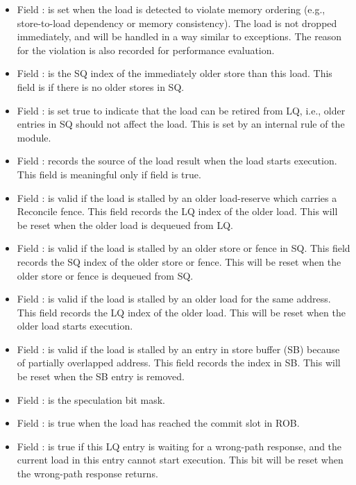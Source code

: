 \begin{itemize}
    \item Field : is set when the load is detected to violate memory ordering (e.g., store-to-load dependency or memory consistency).
    The load is not dropped immediately, and will be handled in a way similar to exceptions.
    The reason for the violation is also recorded for performance evaluation.
    \item Field : is the SQ index of the immediately older store than this load.
    This field is  if there is no older stores in SQ.
    \item Field : is set true to indicate that the load can be retired from LQ, i.e., older entries in SQ should not affect the load.
    This is set by an internal rule of the module.
    \item Field : records the source of the load result when the load starts execution.
    This field is meaningful only if field  is true.
    \item Field : is valid if the load is stalled by an older load-reserve which carries a Reconcile fence.
    This field records the LQ index of the older load.
    This will be reset when the older load is dequeued from LQ.
    \item Field : is valid if the load is stalled by an older store or fence in SQ.
    This field records the SQ index of the older store or fence.
    This will be reset when the older store or fence is dequeued from SQ.
    \item Field : is valid if the load is stalled by an older load for the same address.
    This field records the LQ index of the older load.
    This will be reset when the older load starts execution.
    \item Field : is valid if the load is stalled by an entry in store buffer (SB) because of partially overlapped address.
    This field records the index in SB.
    This will be reset when the SB entry is removed.
    \item Field : is the speculation bit mask.
    \item Field : is true when the load has reached the commit slot in ROB.
    \item Field : is true if this LQ entry is waiting for a wrong-path response, and the current load in this entry cannot start execution.
    This bit will be reset when the wrong-path response returns.
\end{itemize}

